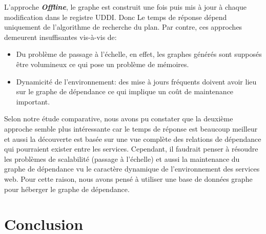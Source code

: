   L'approche \textbf{\textit{Offline}}, le graphe est construit une
  fois puis mis à jour à chaque modification dans le registre
  UDDI. Donc Le temps de réponse dépend uniquement de l'algorithme de
  recherche du plan. Par contre, ces approches demeurent insuffisantes
  vis-à-vis de:\medskip

  \SpecialItem
  \begin{itemize}
  \item Du problème de passage à l'échelle, en effet, les graphes
    générés sont supposés être volumineux ce qui pose un problème de
    mémoires.

  \item Dynamicité de l'environnement: des mise à jours fréquents
    doivent avoir lieu sur le graphe de dépendance ce qui implique un
    coût de maintenance important.\bigskip

  \end{itemize}
  \enddescription

\newpage

\newpage


Selon notre étude comparative, nous avons pu constater que la deuxième
approche semble plus intéressante car le temps de réponse est beaucoup
meilleur et aussi la découverte est basée sur une vue complète des
relations de dépendance qui pourraient exister entre les services.
Cependant, il faudrait penser à résoudre les problèmes de scalabilité
(passage à l'échelle) et aussi la maintenance du graphe de dépendance
vu le caractère dynamique de l'environnement des services web.  Pour
cette raison, nous avons pensé à utiliser une base de données graphe
pour héberger le graphe de dépendance.

\section*{Conclusion}
\label{sec:conclusion}
 



